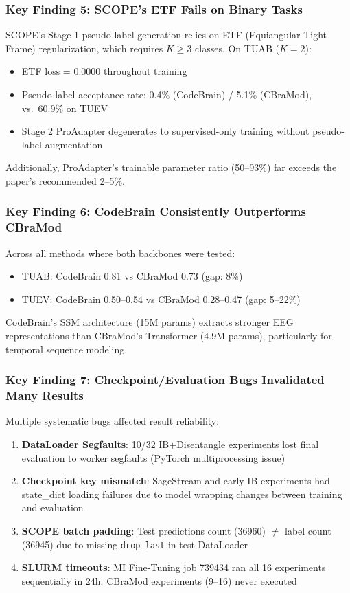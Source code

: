 \documentclass{article}
\begin{document}
\subsubsection{Key Finding 5: SCOPE's ETF Fails on Binary Tasks}

SCOPE's Stage 1 pseudo-label generation relies on ETF (Equiangular Tight Frame) regularization, which requires $K \geq 3$ classes. On TUAB ($K=2$):
\begin{itemize}
\item ETF loss = 0.0000 throughout training
\item Pseudo-label acceptance rate: 0.4\% (CodeBrain) / 5.1\% (CBraMod), vs.\ 60.9\% on TUEV
\item Stage 2 ProAdapter degenerates to supervised-only training without pseudo-label augmentation
\end{itemize}
Additionally, ProAdapter's trainable parameter ratio (50--93\%) far exceeds the paper's recommended 2--5\%.

\subsubsection{Key Finding 6: CodeBrain Consistently Outperforms CBraMod}

Across all methods where both backbones were tested:
\begin{itemize}
\item TUAB: CodeBrain 0.81 vs CBraMod 0.73 (gap: 8\%)
\item TUEV: CodeBrain 0.50--0.54 vs CBraMod 0.28--0.47 (gap: 5--22\%)
\end{itemize}
CodeBrain's SSM architecture (15M params) extracts stronger EEG representations than CBraMod's Transformer (4.9M params), particularly for temporal sequence modeling.

\subsubsection{Key Finding 7: Checkpoint/Evaluation Bugs Invalidated Many Results}

Multiple systematic bugs affected result reliability:
\begin{enumerate}
\item \textbf{DataLoader Segfaults}: 10/32 IB+Disentangle experiments lost final evaluation to worker segfaults (PyTorch multiprocessing issue)
\item \textbf{Checkpoint key mismatch}: SageStream and early IB experiments had state\_dict loading failures due to model wrapping changes between training and evaluation
\item \textbf{SCOPE batch padding}: Test predictions count (36960) $\neq$ label count (36945) due to missing \texttt{drop\_last} in test DataLoader
\item \textbf{SLURM timeouts}: MI Fine-Tuning job 739434 ran all 16 experiments sequentially in 24h; CBraMod experiments (9--16) never executed
\end{enumerate}
\end{document}
